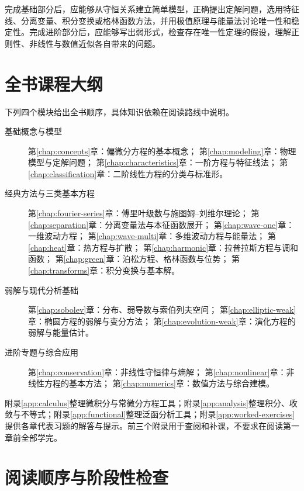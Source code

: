 完成基础部分后，应能够从守恒关系建立简单模型，正确提出定解问题，选用特征线、分离变量、积分变换或格林函数方法，并用极值原理与能量法讨论唯一性和稳定性。完成进阶部分后，应能够写出弱形式，检查存在唯一性定理的假设，理解正则性、非线性与数值近似各自带来的问题。

\section{全书课程大纲}

下列四个模块给出全书顺序，具体知识依赖在阅读路线中说明。

\begin{description}
  \item[基础概念与模型]
  第\ref{chap:concepts}章：偏微分方程的基本概念；
  第\ref{chap:modeling}章：物理模型与定解问题；
  第\ref{chap:characteristics}章：一阶方程与特征线法；
  第\ref{chap:classification}章：二阶线性方程的分类与标准形。
  \item[经典方法与三类基本方程]
  第\ref{chap:fourier-series}章：傅里叶级数与施图姆--刘维尔理论；
  第\ref{chap:separation}章：分离变量法与本征函数展开；
  第\ref{chap:wave-one}章：一维波动方程；
  第\ref{chap:wave-multi}章：多维波动方程与能量法；
  第\ref{chap:heat}章：热方程与扩散；
  第\ref{chap:harmonic}章：拉普拉斯方程与调和函数；
  第\ref{chap:green}章：泊松方程、格林函数与位势；
  第\ref{chap:transforms}章：积分变换与基本解。
  \item[弱解与现代分析基础]
  第\ref{chap:sobolev}章：分布、弱导数与索伯列夫空间；
  第\ref{chap:elliptic-weak}章：椭圆方程的弱解与变分方法；
  第\ref{chap:evolution-weak}章：演化方程的弱解与能量估计。
  \item[进阶专题与综合应用]
  第\ref{chap:conservation}章：非线性守恒律与熵解；
  第\ref{chap:nonlinear}章：非线性方程的基本方法；
  第\ref{chap:numerics}章：数值方法与综合建模。
\end{description}

附录\ref{app:calculus}整理微积分与常微分方程工具；附录\ref{app:analysis}整理积分、收敛与不等式；附录\ref{app:functional}整理泛函分析工具；附录\ref{app:worked-exercises}提供各章代表习题的解答与提示。前三个附录用于查阅和补课，不要求在阅读第一章前全部学完。

\section{阅读顺序与阶段性检查}

